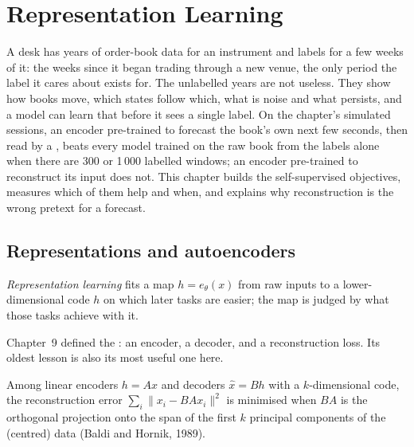 \chapter{Representation Learning}\label{ch:ml:representation-learning}

A desk has years of order-book data for an instrument and labels for a few weeks of it: the weeks since it began trading
through a new venue, the only period the label it cares about exists for. The unlabelled years are not useless. They
show how books move, which states follow which, what is noise and what persists, and a model can learn that before it
sees a single label. On the chapter's simulated sessions, an encoder pre-trained to forecast the book's own next few
seconds, then read by a , beats every model trained on the raw book from the labels alone when there are
300 or 1\,000 labelled windows; an encoder pre-trained to reconstruct its input does not. This chapter builds the
self-supervised objectives, measures which of them help and when, and explains why reconstruction is the wrong pretext
for a forecast.

\section{Representations and autoencoders}

\begin{definition}\label{def:ml:representation-learning:representation}
\emph{Representation learning} fits a map $h = e_\theta(x)$ from raw inputs to a
lower-dimensional code $h$ on which later tasks are easier; the map is judged by what those tasks achieve with it.
\end{definition}

Chapter~9 defined the : an encoder, a decoder, and a reconstruction loss. Its oldest lesson is also its most
useful one here.

\begin{proposition}\label{prop:ml:represent:pca}
Among linear encoders $h = Ax$ and decoders $\hat x = Bh$ with a $k$-dimensional code, the reconstruction error
$\sum_i\lVert x_i - BAx_i\rVert^2$ is minimised when $BA$ is the orthogonal projection onto the span of the first $k$
principal components of the (centred) data (Baldi and Hornik, 1989).
\end{proposition}

